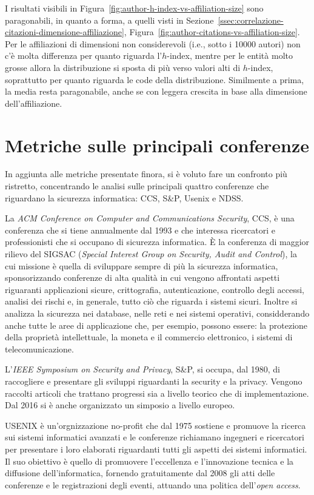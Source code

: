 I risultati visibili in Figura~\ref{fig:author-h-index-vs-affiliation-size}
sono paragonabili, in quanto a forma, a quelli visti in
Sezione~\ref{ssec:correlazione-citazioni-dimensione-affiliazione},
Figura~\ref{fig:author-citations-vs-affiliation-size}.
Per le affiliazioni di dimensioni non considerevoli (i.e., sotto i 10000 autori)
non c'è molta differenza per quanto riguarda l'$h$-index, mentre per le entità
molto grosse allora la distribuzione si sposta di più verso valori alti di
$h$-index, soprattutto per quanto riguarda le code della distribuzione.
Similmente a prima, la media resta paragonabile, anche se con leggera crescita
in base alla dimensione dell'affiliazione.


\section{Metriche sulle principali conferenze}
In aggiunta alle metriche presentate finora, si è voluto fare un confronto più ristretto, concentrando le analisi sulle principali quattro conferenze che riguardano la sicurezza informatica: CCS, S\&P, Usenix e NDSS.

La \textit{ACM Conference on Computer and Communications Security}, CCS, è una conferenza che si tiene annualmente dal 1993 e che interessa ricercatori e professionisti che si occupano di sicurezza informatica. È la conferenza di maggior rilievo del SIGSAC (\textit{Special Interest Group on Security, Audit and Control}), la cui missione è quella di sviluppare sempre di più la sicurezza informatica, sponsorizzando conferenze di alta qualità in cui vengono affrontati aspetti riguaranti applicazioni sicure, crittografia, autenticazione, controllo degli accessi, analisi dei rischi e, in generale, tutto ciò che riguarda i sistemi sicuri. Inoltre si analizza la sicurezza nei database, nelle reti e nei sistemi operativi, considderando anche tutte le aree di applicazione che, per esempio, possono essere: la protezione della proprietà intellettuale, la moneta e il commercio elettronico, i sistemi di telecomunicazione. 

L'\textit{IEEE Symposium on Security and Privacy}, S\&P, si occupa, dal 1980, di raccogliere e presentare gli sviluppi riguardanti la security e la privacy. Vengono raccolti articoli che trattano progressi sia a livello teorico che di implementazione. Dal 2016 si è anche organizzato un simposio a livello europeo.

USENIX è un'orgnizzazione no-profit che dal 1975 sostiene e promuove la ricerca sui sistemi informatici avanzati e le conferenze richiamano ingegneri e ricercatori per presentare i loro elaborati riguardanti tutti gli aspetti dei sistemi informatici. Il suo obiettivo è quello di promuovere l'eccellenza e l'innovazione tecnica e la diffusione dell'informatica, fornendo gratuitamente dal 2008 gli atti delle conferenze e le registrazioni degli eventi, attuando una politica dell'\textit{open access}. 

